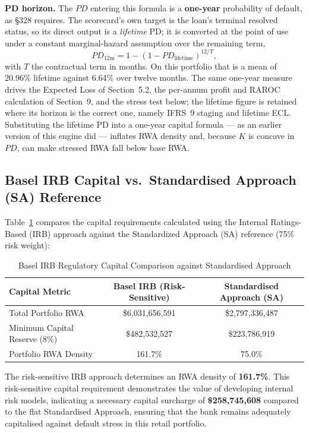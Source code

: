\documentclass[11pt,a4paper]{article}
\begin{document}
\textbf{PD horizon.} The $PD$ entering this formula is a \textbf{one-year} probability of default, as \S328 requires. The scorecard's own target is the loan's terminal resolved status, so its direct output is a \emph{lifetime} PD; it is converted at the point of use under a constant marginal-hazard assumption over the remaining term,
\begin{equation}
PD_{\text{12m}} = 1 - (1 - PD_{\text{lifetime}})^{12/T},
\end{equation}
with $T$ the contractual term in months. On this portfolio that is a mean of 20.96\% lifetime against 6.64\% over twelve months. The same one-year measure drives the Expected Loss of Section~5.2, the per-annum profit and RAROC calculation of Section~9, and the stress test below; the lifetime figure is retained where its horizon is the correct one, namely IFRS~9 staging and lifetime ECL. Substituting the lifetime PD into a one-year capital formula --- as an earlier version of this engine did --- inflates RWA density and, because $K$ is concave in $PD$, can make stressed RWA fall below base RWA.

\subsection{Basel IRB Capital vs.\ Standardised Approach (SA) Reference}
Table~\ref{tab:basel_comparison} compares the capital requirements calculated using the Internal Ratings-Based (IRB) approach against the Standardized Approach (SA) reference (75\% risk weight):

\begin{table}[H]
\centering
\caption{Basel IRB Regulatory Capital Comparison against Standardised Approach}
\label{tab:basel_comparison}
\vspace{0.5em}
\begin{tabular}{p{5.0cm}cc}
\toprule
\textbf{Capital Metric} & \textbf{Basel IRB (Risk-Sensitive)} & \textbf{Standardised Approach (SA)} \\
\midrule
Total Portfolio RWA & \$6,031,656,591 & \$2,797,336,487 \\
Minimum Capital Reserve (8\%) & \$482,532,527 & \$223,786,919 \\
Portfolio RWA Density & 161.7\% & 75.0\% \\
\bottomrule
\end{tabular}
\end{table}

The risk-sensitive IRB approach determines an RWA density of \textbf{161.7\%}. This risk-sensitive capital requirement demonstrates the value of developing internal risk models, indicating a necessary capital surcharge of \textbf{\$258,745,608} compared to the flat Standardised Approach, ensuring that the bank remains adequately capitalised against default stress in this retail portfolio.
\end{document}
